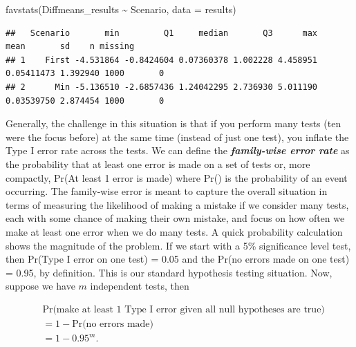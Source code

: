 \documentclass[
]{book}
\newenvironment{Shaded}{\begin{snugshade}}{\end{snugshade}}
\newcommand{\AttributeTok}[1]{\textcolor[rgb]{0.77,0.63,0.00}{#1}}
\newcommand{\FunctionTok}[1]{\textcolor[rgb]{0.00,0.00,0.00}{#1}}
\newcommand{\NormalTok}[1]{#1}
\newcommand{\SpecialCharTok}[1]{\textcolor[rgb]{0.00,0.00,0.00}{#1}}
\begin{document}
\begin{Shaded}
\begin{Highlighting}[]
\FunctionTok{favstats}\NormalTok{(Diffmeans\_results }\SpecialCharTok{\textasciitilde{}}\NormalTok{ Scenario, }\AttributeTok{data =}\NormalTok{ results)}
\end{Highlighting}
\end{Shaded}

\begin{verbatim}
##   Scenario       min         Q1     median       Q3      max       mean       sd    n missing
## 1    First -4.531864 -0.8424604 0.07360378 1.002228 4.458951 0.05411473 1.392940 1000       0
## 2      Min -5.136510 -2.6857436 1.24042295 2.736930 5.011190 0.03539750 2.874454 1000       0
\end{verbatim}

\normalsize

\newpage

\indent Generally, the challenge in this situation is that if you perform many tests (ten were the focus before) at the same time (instead of just one test), you inflate the
Type I error rate across the tests.
We can define the \textbf{\emph{family-wise error rate}} 
as the probability that at least one error is made on a set of tests or, more
compactly, Pr(At least 1 error is made) where Pr() is the probability of an
event occurring. The family-wise error is meant to capture the overall
situation in terms of measuring the likelihood of making a mistake if we
consider many tests, each with some chance of making their own mistake, and
focus on how often we make at least one error when we do many tests. A quick
probability calculation shows the magnitude of the problem. If we start with a
5\% significance level test, then Pr(Type I error on one test) = 0.05 and the Pr(no
errors made on one test) = 0.95, by definition. This is our standard hypothesis
testing situation. Now, suppose we have \(m\) independent tests, then

\[\begin{array}{ll}
& \text{Pr(make at least 1 Type I error given all null hypotheses are true)} \\
& = 1 - \text{Pr(no errors made)} \\
& = 1 - 0.95^m.
\end{array}\]
\end{document}
